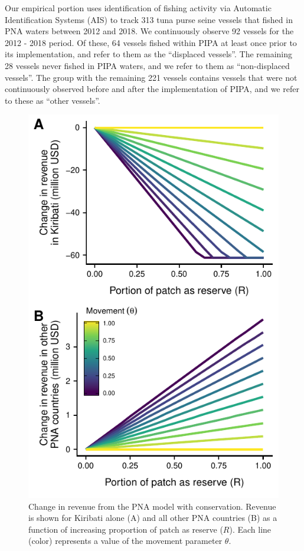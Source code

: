\documentclass[9p,twocolumn,twoside,lineno]{pnas-new}
\begin{document}
Our empirical portion uses identification of fishing activity via Automatic Identification Systems (AIS) to track 313 tuna purse seine vessels that fished in PNA waters between 2012 and 2018. We continuously observe 92 vessels for the 2012 - 2018 period. Of these, 64 vessels fished within PIPA at least once prior to its implementation, and refer to them as the ``displaced vessels''. The remaining 28 vessels never fished in PIPA waters, and we refer to them as ``non-displaced vessels''. The group with the remaining 221 vessels contains vessels that were not continuously observed before and after the implementation of PIPA, and we refer to these as ``other vessels''.

\begin{figure}[htbp]
\centering
\includegraphics{img/PNA_model.pdf}
\caption{\label{fig:PNA_model}Change in revenue from the PNA model with conservation. Revenue is shown for Kiribati alone (A) and all other PNA countries (B) as a function of increasing proportion of patch as reserve ($R$). Each line (color) represents a value of the movement parameter $\theta$.}
\end{figure}
\end{document}
